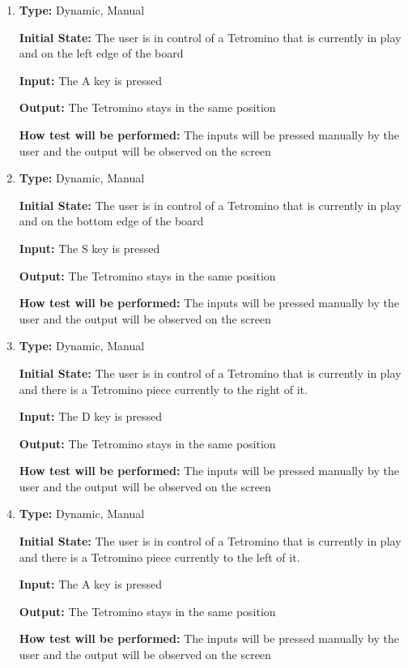 \documentclass[12pt, titlepage]{article}
\begin{document}
\begin{enumerate}[{FR-CI-}1. ]
		\item
		\textbf{Type:} Dynamic, Manual
		
		\textbf{Initial State:} The user is in control of a Tetromino that is currently in play and on the left edge of the board
		
		\textbf{Input:} The A key is pressed 
		
		\textbf{Output:} The Tetromino stays in the same position
		
		\textbf{How test will be performed:} The inputs will be pressed manually by the user and the output will be observed on the screen
		
		\item
		\textbf{Type:} Dynamic, Manual
		
		\textbf{Initial State:} The user is in control of a Tetromino that is currently in play and on the bottom edge of the board
		
		\textbf{Input:} The S key is pressed 
		
		\textbf{Output:} The Tetromino stays in the same position
		
		\textbf{How test will be performed:} The inputs will be pressed manually by the user and the output will be observed on the screen
		
		\item
		\textbf{Type:} Dynamic, Manual
		
		\textbf{Initial State:} The user is in control of a Tetromino that is currently in play and there is a Tetromino piece currently to the right of it.
		
		\textbf{Input:} The D key is pressed 
		
		\textbf{Output:} The Tetromino stays in the same position
		
		\textbf{How test will be performed:} The inputs will be pressed manually by the user and the output will be observed on the screen
		
		\item
		\textbf{Type:} Dynamic, Manual
		
		\textbf{Initial State:} The user is in control of a Tetromino that is currently in play and there is a Tetromino piece currently to the left of it.
		
		\textbf{Input:} The A key is pressed 
		
		\textbf{Output:} The Tetromino stays in the same position
		
		\textbf{How test will be performed:} The inputs will be pressed manually by the user and the output will be observed on the screen
		

\end{enumerate}
\end{document}
